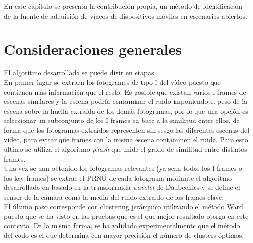 En este capítulo se presenta la contribución propia, un método de identificación de la fuente de adquisión de vídeos de dispositivos móviles en escenarios abiertos.

\section{Consideraciones generales}
El algoritmo desarrollado se puede divir en etapas. \\

En primer lugar se extraen los fotogrames de tipo I del vídeo puesto que contienen más información que el resto. Es posible que existan varios I-frames de escenas similares y la escena podría contaminar el ruido imponiendo el peso de la escena sobre la huella extraída de los demás fotogramas, por lo que una opción es seleccionar un subconjunto de los I-frames en base a la similitud entre ellos, de forma que los fotogramas extraídos representen sin sesgo las diferentes escenas del vídeo, para evitar que frames con la misma escena contaminen el ruido. Para esto último se utiliza el algoritmo \textit{phash} que mide el grado de similitud entre distintos frames. \\

Una vez se han obtenido los fotogramas relevantes (ya sean todos los I-frames o los key-frames) se extrae el PRNU de cada fotograma mediante el algoritmo desarrollado en \cite{ana:2015} basado en la transformada \textit{wavelet} de Daubechies y se define el sensor de la cámara como la media del ruido extraído de los frames clave. \\

El último paso corresponde con clustering jerárquico utilizando el método Ward puesto que se ha visto en las pruebas que es el que mejor resultado otorga en este contexto. De la misma forma, se ha validado experimentalmente que el método del codo es el que determina con mayor precisión el número de clusters óptimos. \\

